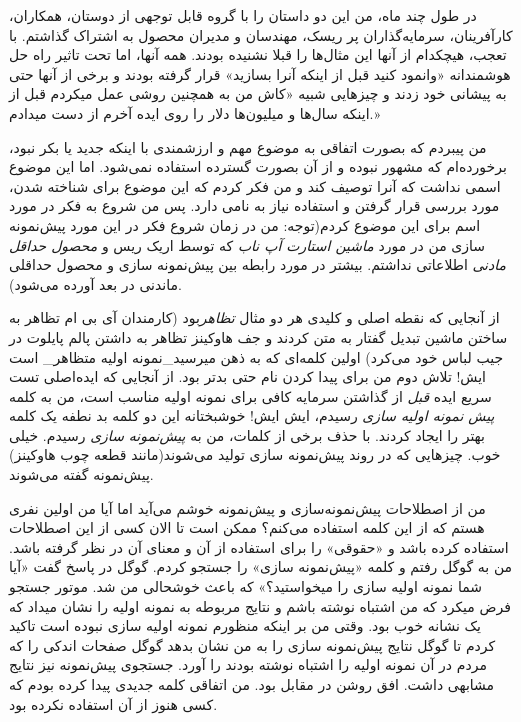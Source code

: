 در طول چند ماه، من این دو داستان را با گروه قابل توجهی از دوستان،
همکاران، کارآفرینان، سرمایه‌گذاران پر ریسک، مهندسان و مدیران محصول به
اشتراک گذاشتم. با تعجب، هیچکدام از آنها این مثال‌ها را قبلا نشنیده
بودند. همه آنها، اما تحت تاثیر راه حل هوشمندانه «وانمود کنید قبل از
اینکه آنرا بسازید» قرار گرفته بودند و برخی از آنها حتی به پیشانی خود
زدند و چیزهایی شبیه «کاش من به همچنین روشی عمل میکردم قبل از اینکه
سال‌ها و میلیون‌ها دلار را روی ایده آخرم از دست میدادم.»

من پیبردم که بصورت اتفاقی به موضوع مهم و ارزشمندی با اینکه جدید یا بکر
نبود، برخورده‌ام که مشهور نبوده و از آن بصورت گسترده استفاده نمی‌شود.
اما این موضوع اسمی نداشت که آنرا توصیف کند و من فکر کردم که این موضوع
برای شناخته شدن، مورد بررسی قرار گرفتن و استفاده نیاز به نامی دارد. پس
من شروع به فکر در مورد اسم برای این موضوع کردم(توجه: من در زمان شروع فکر
در این مورد پیش‌نمونه سازی من در مورد \emph{ماشین استارت آپ ناب} که توسط
اریک ریس و \emph{محصول حداقل مادنی} اطلاعاتی نداشتم. بیشتر در مورد رابطه
بین پیش‌نمونه سازی و محصول حداقلی ماندنی در بعد آورده می‌شود).

از آنجایی که نقطه اصلی و کلیدی هر دو مثال \emph{تظاهر}بود (کارمندان آی
بی ام تظاهر به ساختن ماشین تبدیل گفتار به متن کردند و جف هاوکینز تظاهر
به داشتن پالم پایلوت در جیب لباس خود می‌کرد) اولین کلمه‌ای که به ذهن
میرسید\_‌نمونه اولیه متظاهر\_ است ایش! تلاش دوم من برای پیدا کردن نام
حتی بدتر بود. از آنجایی که ایده‌اصلی تست سریع ایده \emph{قبل} از گذاشتن
سرمایه کافی برای نمونه اولیه مناسب است، من به کلمه \emph{پیش نمونه اولیه
سازی} رسیدم، ایش ایش! خوشبختانه این دو کلمه بد نطفه یک کلمه بهتر را
ایجاد کردند. با حذف برخی از کلمات، من به \emph{پیش‌نمونه سازی} رسیدم.
خیلی خوب. چیزهایی که در روند پیش‌نمونه سازی تولید می‌شوند(مانند قطعه چوب
هاوکینز) پیش‌نمونه گفته می‌شوند.

من از اصطلاحات پیش‌نمونه‌سازی و پیش‌نمونه خوشم می‌آید اما آیا من اولین
نفری هستم که از این کلمه استفاده می‌کنم؟ ممکن است تا الان کسی از این
اصطلاحات استفاده کرده باشد و «حقوقی» را برای استفاده از آن و معنای آن در
نظر گرفته باشد. من به گوگل رفتم و کلمه «پیش‌نمونه سازی» را جستجو کردم.
گوگل در پاسخ گفت «آیا شما نمونه اولیه سازی را میخواستید؟» که باعث
خوشحالی من شد. موتور جستجو فرض میکرد که من اشتباه نوشته باشم و نتایج
مربوطه به نمونه اولیه را نشان میداد که یک نشانه خوب بود. وقتی من بر
اینکه منظورم نمونه اولیه سازی نبوده است تاکید کردم تا گوگل نتایج
پیش‌نمونه سازی را به من نشان بدهد گوگل صفحات اندکی را که مردم در آن
نمونه اولیه را اشتباه نوشته بودند را آورد. جستجوی پیش‌نمونه نیز نتایج
مشابهی داشت. افق روشن در مقابل بود. من اتفاقی کلمه جدیدی پیدا کرده بودم
که کسی هنوز از آن استفاده نکرده بود.

